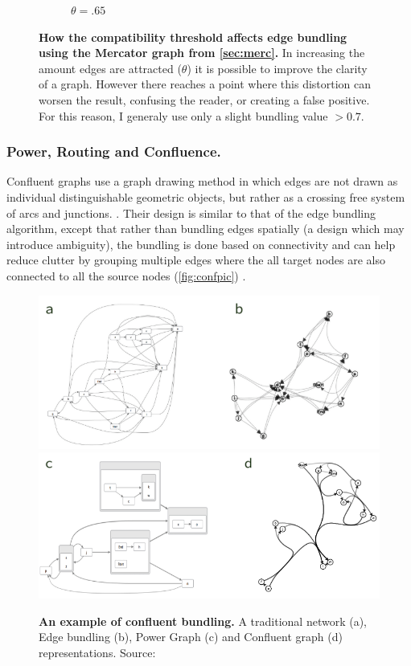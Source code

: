 \begin{figure}[H]
\begin{subfigure}[b]{.49\textwidth}
 \caption{$\theta = .65$}
 \end{subfigure}
        \caption{\textbf{How the compatibility threshold affects edge bundling using the Mercator graph from \autoref{sec:merc}.} In increasing the amount edges are attracted ($\theta$) it is possible to improve the clarity of a graph. However there reaches a point where this distortion can worsen the result, confusing the reader, or creating a false positive. For this reason, I generaly use only a slight bundling value $> 0.7$.}
      \label{fig:edgebundling}
\end{figure}

\subsubsection{Power, Routing and Confluence.}

Confluent graphs use a graph drawing method in which edges are not drawn as individual distinguishable geometric objects, but rather as a crossing free system of arcs and junctions. \citep{confluient19}. Their design is similar to that of the edge bundling algorithm, except that rather than bundling edges spatially (a design which may introduce ambiguity), the bundling is done based on connectivity and can help reduce clutter by grouping multiple edges where the all target nodes are also connected to all the source nodes (\autoref{fig:confpic}) \citep{confpic}. 

\begin{figure}[H]
     \centering
     \includegraphics[width=.75\textwidth]{figures_c1/layout/confluent/example2.png}\\
     \includegraphics[width=.75\textwidth]{figures_c1/layout/confluent/example.png}\\
        \caption{\textbf{An example of confluent bundling. } A traditional network (a), Edge bundling (b), Power Graph (c) and Confluent graph (d) representations. Source: \citep{confpic}}
      \label{fig:confpic}
\end{figure}

